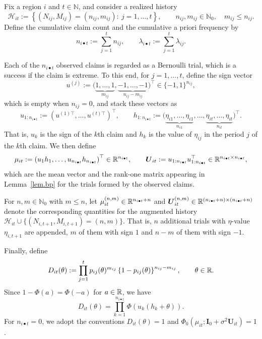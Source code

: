 \begin{remark}\label{rem.thin.notation}
Fix a region \(i\) and \(t\in\mathbb N\), and consider a realized
history
\[
\mathcal H_{it}:=
\left\{
(N_{ij},M_{ij})=(n_{ij},m_{ij}):\ j=1,\ldots,t
\right\},
\qquad
n_{ij},m_{ij}\in\mathbb N_0,
\quad
m_{ij}\le n_{ij}.
\]
Define the cumulative claim count and the cumulative a priori
frequency by
\[
n_{i\bullet t}:=\sum_{j=1}^t n_{ij},
\qquad
\lambda_{i\bullet t}:=\sum_{j=1}^t \lambda_{ij}.
\]

Each of the \(n_{i\bullet t}\) observed claims is regarded as a
Bernoulli trial, which is a success if the claim is extreme. To this
end, for \(j=1,\ldots,t\), define the sign vector
\[
u^{(j)}:=
\big(
\underbrace{1,\ldots,1}_{m_{ij}},
\underbrace{-1,\ldots,-1}_{n_{ij}-m_{ij}}
\big)^\top
\in\{-1,1\}^{n_{ij}},
\]
which is empty when \(n_{ij}=0\), and stack these vectors as
\[
u_{1:n_{i\bullet t}}:=
\left(
u^{(1)\top},\ldots,u^{(t)\top}
\right)^\top,
\qquad
h_{1:n_{i\bullet t}}:=
\big(
\underbrace{\eta_{i1},\ldots,\eta_{i1}}_{n_{i1}},
\ldots,
\underbrace{\eta_{it},\ldots,\eta_{it}}_{n_{it}}
\big)^\top .
\]
That is, \(u_k\) is the sign of the \(k\)th claim and \(h_k\) is the
value of \(\eta_{ij}\) in the period \(j\) of the \(k\)th claim. We then
define
\[
\mu_{it}:=
\left(u_1h_1,\ldots,u_{n_{i\bullet t}}h_{n_{i\bullet t}}\right)^\top
\in\mathbb{R}^{n_{i\bullet t}},
\qquad
\boldsymbol U_{it}:=
u_{1:n_{i\bullet t}}u_{1:n_{i\bullet t}}^\top
\in\mathbb{R}^{n_{i\bullet t}\times n_{i\bullet t}},
\]
which are the mean vector and the rank-one matrix appearing in
Lemma~\ref{lem.bp} for the trials formed by the observed claims.

For \(n,m\in\mathbb N_0\) with \(m\le n\), let
\(\mu_{it}^{(n,m)}\in\mathbb{R}^{n_{i\bullet t}+n}\) and
\(\boldsymbol U_{it}^{(n,m)}\in\mathbb{R}^{(n_{i\bullet t}+n)\times(n_{i\bullet t}+n)}\)
denote the corresponding quantities for the augmented history
\(\mathcal H_{it}\cup\{(N_{i,t+1},M_{i,t+1})=(n,m)\}\). That is,
\(n\) additional trials with \(\eta\)-value \(\eta_{i,t+1}\) are appended,
\(m\) of them with sign \(1\) and \(n-m\) of them with sign \(-1\).

Finally, define
\[
D_{it}(\theta):=
\prod_{j=1}^t
p_{ij}(\theta)^{m_{ij}}
\left\{1-p_{ij}(\theta)\right\}^{n_{ij}-m_{ij}},
\qquad\theta\in\mathbb{R}.
\]
Since \(1-\Phi(a)=\Phi(-a)\) for \(a\in\mathbb{R}\), we have
\begin{equation}\label{eq.thin.D}
D_{it}(\theta)
=
\prod_{k=1}^{n_{i\bullet t}}
\Phi\left(u_k(h_k+\theta)\right).
\end{equation}
For \(n_{i\bullet t}=0\), we adopt the conventions
\(D_{it}(\theta)=1\) and
\(\Phi_0\left(\mu_{it};\boldsymbol I_0+\sigma^2\boldsymbol U_{it}\right)=1\).
\end{remark}

